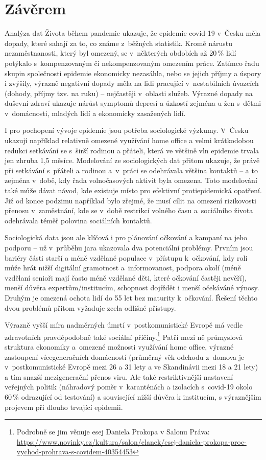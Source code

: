 \section*{Závěrem}

Analýza dat Života během pandemie ukazuje, že epidemie covid-19 v Česku měla dopady, které sahají za to, co známe z běžných statistik. Kromě nárustu nezaměstnanosti, který byl omezený, se v některých obdobích až 20\,\% lidí potýkalo s kompenzovaným či nekompenzovaným omezením práce. Zatímco řadu skupin společnosti epidemie ekonomicky nezasáhla, nebo se jejich příjmy a úspory i zvýšily, výrazně negativní dopady měla na lidi pracující v nestabilních úvazcích (dohody, příjmy tzv. na ruku) – nejčastěji v oblasti služeb. Výrazné dopady na duševní zdraví ukazuje nárůst symptomů depresí a úzkostí zejména u žen s dětmi v domácnosti, mladých lidí a ekonomicky zasažených lidí.

I pro pochopení vývoje epidemie jsou potřeba sociologické výzkumy. V Česku ukazují například relativně omezené využívání home office a velmi krátkodobou redukci setkávání se s širší rodinou a přáteli, která ve většině vln epidemie trvala jen zhruba 1,5 měsíce. Modelování ze sociologických dat přitom ukazuje, že právě při setkávání s přáteli a rodinou a v práci se odehrávala většina kontaktů – a to zejména v době, kdy řada volnočasových aktivit byla omezena. Toto modelování také může dávat návod, kde existuje místo pro efektivní protiepidemická opatření. Již od konce podzimu například bylo zřejmé, že musí cílit na omezení rizikovosti přenosu v zaměstnání, kde se v době restrikcí volného času a sociálního života odehrávala téměř polovina sociálních kontaktů.

Sociologická data jsou ale klíčová i pro plánování očkování a kampaní na jeho podporu – už v průběhu jara ukazovala dva potenciální problémy. Prvním jsou bariéry části starší a méně vzdělané populace v přístupu k očkování, kdy roli může hrát nižší digitální gramotnost a informovanost, podpora okolí (méně vzdělaní senioři mají často méně vzdělané děti, které očkování častěji nevěří), menší důvěra expertům/institucím, schopnost dojíždět i menší očekáváné výnosy. Druhým je omezená ochota lidí do 55 let bez maturity k očkování. Řešení těchto dvou problémů přitom vyžaduje zcela odlišné přístupy.

Výrazně vyšší míra nadměrných úmrtí v postkomunistické Evropě má vedle zdravotních pravděpodobně také sociální příčiny.\footnote{Podrobně se jim věnuje esej Daniela Prokopa v Salonu Práva: \url{https://www.novinky.cz/kultura/salon/clanek/esej-daniela-prokopa-proc-vychod-prohrava-s-covidem-40354453}} Patří mezi ně průmyslová struktura ekonomiky a omezené možnosti využívání home office, výrazné zastoupení vícegeneračních domácností (průměrný věk odchodu z domova je v postkomunistické Evropě mezi 26 a 31 lety a ve Skandinávii mezi 18 a 21 lety) a tím snazší mezigenerační přenos viru. Ale také restriktivnější nastavení veřejných politik (náhradový poměr v karanténách a izolacích s covid-19 okolo 60\,\% odrazující od testování) a související nižší důvěra k institucím, s výraznějším projevem při dlouho trvající epidemii.

